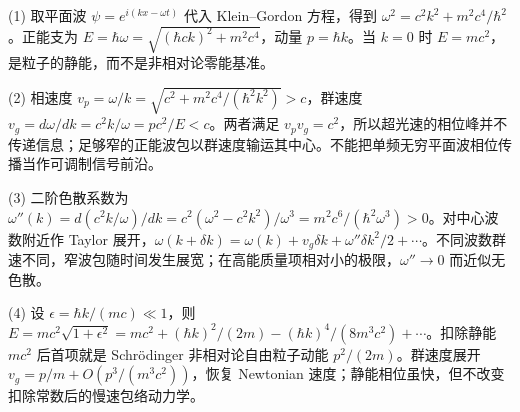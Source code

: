 (1) 取平面波 \(\psi=e^{i(kx-\omega t)}\) 代入 Klein--Gordon 方程，得到 \(\omega^2=c^2k^2+m^2c^4/\hbar^2\)。正能支为 \(E=\hbar\omega=\sqrt{(\hbar ck)^2+m^2c^4}\)，动量 \(p=\hbar k\)。当 \(k=0\) 时 \(E=mc^2\)，是粒子的静能，而不是非相对论零能基准。

(2) 相速度 \(v_p=\omega/k=\sqrt{c^2+m^2c^4/(\hbar^2k^2)}>c\)，群速度 \(v_g=d\omega/dk=c^2k/\omega=pc^2/E<c\)。两者满足 \(v_pv_g=c^2\)，所以超光速的相位峰并不传递信息；足够窄的正能波包以群速度输运其中心。不能把单频无穷平面波相位传播当作可调制信号前沿。

(3) 二阶色散系数为 \(\omega''(k)=d(c^2k/\omega)/dk=c^2(\omega^2-c^2k^2)/\omega^3=m^2c^6/(\hbar^2\omega^3)>0\)。对中心波数附近作 Taylor 展开，\(\omega(k+\delta k)=\omega(k)+v_g\delta k+\omega''\delta k^2/2+\cdots\)。不同波数群速不同，窄波包随时间发生展宽；在高能质量项相对小的极限，\(\omega''\to0\) 而近似无色散。

(4) 设 \(\epsilon=\hbar k/(mc)\ll1\)，则 \(E=mc^2\sqrt{1+\epsilon^2}=mc^2+(\hbar k)^2/(2m)-(\hbar k)^4/(8m^3c^2)+\cdots\)。扣除静能 \(mc^2\) 后首项就是 Schrödinger 非相对论自由粒子动能 \(p^2/(2m)\)。群速度展开 \(v_g=p/m+O(p^3/(m^3c^2))\)，恢复 Newtonian 速度；静能相位虽快，但不改变扣除常数后的慢速包络动力学。

